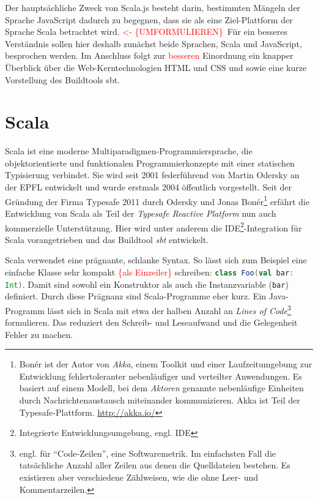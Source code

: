 \documentclass[a4paper, 12pt, hidelinks, listof=totoc, listoftables=totoc, bibliography=totoc]{scrreprt}
\newcommand{\scala}[1]{\lstinline[language=Scala, style=inline]|#1|}
\newcommand{\TODO}[1]{\textcolor{red}{#1}\newline}
\newcommand{\TODOi}[1]{\textcolor{red}{\{#1\}}}
\newcommand{\REDOi}{\textcolor{red}{<- \{UMFORMULIEREN\}~}}
\begin{document}
Der hauptsächliche Zweck von Scala.js besteht darin, bestimmten Mängeln der Sprache JavaScript dadurch zu begegnen, dass sie als eine Ziel-Plattform der Sprache Scala betrachtet wird. \REDOi Für ein besseres Verständnis sollen hier deshalb zunächst beide Sprachen, Scala und JavaScript, besprochen werden. Im Anschluss folgt zur \TODO{besseren} Einordnung ein knapper Überblick über die Web-Kerntechnologien HTML und CSS und sowie eine kurze Vorstellung des Buildtools sbt.

\section{Scala}



Scala ist eine moderne Multiparadigmen-Programmiersprache, die objektorientierte und funktionalen Programmierkonzepte mit einer statischen Typisierung verbindet. Sie wird seit 2001 federführend von Martin Odersky an der \ac{EPFL} entwickelt und wurde erstmals 2004 öffentlich vorgestellt.
Seit der Gründung der Firma Typesafe 2011 durch Odersky und Jonas Bonér\footnote{Bonér ist der Autor von \emph{Akka}, einem Toolkit und einer Laufzeitumgebung zur Entwicklung fehlertoleranter nebenläufiger und verteilter Anwendungen. Es basiert auf einem Modell, bei dem \emph{Aktoren} genannte nebenläufige Einheiten durch Nachrichtenaustausch miteinander kommunizieren. Akka ist Teil der Typesafe-Plattform. \url{http://akka.io/}} erfährt die Entwicklung von Scala als Teil der \emph{Typesafe Reactive Platform} nun auch kommerzielle Unterstützung.
Hier wird unter anderem die IDE\footnote{Integrierte Entwicklungsumgebung, engl. \ac{IDE}}-Integration für Scala vorangetrieben und das Buildtool \emph{sbt} entwickelt.\cite{scala-lang2011.CSS} 

Scala verwendet eine prägnante, schlanke Syntax. So lässt sich zum Beispiel eine einfache Klasse sehr kompakt \TODOi{als Einzeiler} schreiben: \scala{class Foo(val bar: Int)}. Damit sind sowohl ein Konstruktor als auch die Instanzvariable (\scala{bar}) definiert. Durch diese Prägnanz sind Scala-Programme eher kurz. Ein Java-Programm lässt sich in Scala mit etwa der halben Anzahl an \emph{Lines of Code}\footnote{engl. für "`Code-Zeilen"', eine Softwaremetrik. Im einfachsten Fall die tatsächliche Anzahl aller Zeilen aus denen die Quelldateien bestehen. Es existieren aber verschiedene Zählweisen, wie die ohne Leer- und Kommentarzeilen.} formulieren. Das reduziert den Schreib- und Leseaufwand und die Gelegenheit Fehler zu machen.
\end{document}
